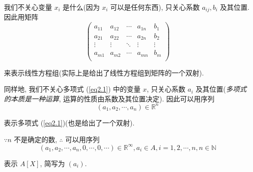 \documentclass[color=black,device=normal,lang=cn,mode=geye]{elegantnote}
\begin{document}
我们不关心变量 $x_i$ 是什么(因为 $x_i$ 可以是任何东西), 只关心系数 $a_{ij},b_i$ 及其位置. 因此用矩阵
\[\begin{pmatrix}
    a_{11} & a_{12} & \cdots & a_{1n} & b_{1} \\
    a_{21} & a_{22} & \cdots & a_{2n} & b_{2} \\
    \vdots & \vdots & \ddots & \vdots & \vdots \\
    a_{m1} & a_{m2} & \cdots & a_{mn} & b_{m} \\
\end{pmatrix}\]

来表示线性方程组(实际上是给出了线性方程组到矩阵的一个双射).

同样地, 我们不关心多项式 (\ref{eq2.1}) 中的变量 $x$, 只关心系数 $a_{i}$ 及其位置(\emph{多项式的本质是一种运算}, 运算的性质由系数及其位置决定). 因此可以用序列
\[(a_1,a_2,\cdots,a_n)\in\mathbb{R}^n\]

表示多项式 (\ref{eq2.1})(也是给出了一个双射).

$\because n$ 不是确定的数, $\therefore$ 可以用序列
\[(a_1,a_2,\cdots,a_n,0,\cdots,0,\cdots)\in\mathbb{R}^\infty,a_i\in A,i=1,2,\cdots,n,n\in\mathbb{N}\]

表示 $A[X]$, 简写为 $(a_i)$.
\end{document}
